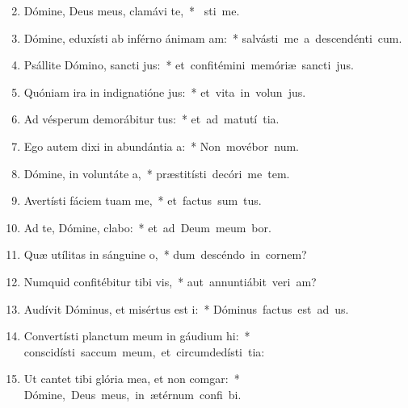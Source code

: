 \begin{flushleft}
\begin{enumerate}[leftmargin=*]
\setcounter{enumi}{1}

\item Dómine, Deus meus, clamávi  te,~* \mbox{ sti me.}
\item Dómine, eduxísti ab inférno ánimam am:~* \mbox{salvásti me a descendénti  cum.}
\item Psállite Dómino, sancti jus:~* \mbox{et confitémini memóriæ sancti jus.}
\item Quóniam ira in indignatióne jus:~* \mbox{et vita in volun jus.}
\item Ad vésperum demorábitur tus:~* \mbox{et ad matutí tia.}
\item Ego autem dixi in abundántia a:~* \mbox{Non movébor  num.}
\item Dómine, in voluntáte a,~* \mbox{præstitísti decóri me tem.}
\item Avertísti fáciem tuam  me,~* \mbox{et factus sum tus.}
\item Ad te, Dómine, clabo:~* \mbox{et ad Deum meum bor.}
\item Quæ utílitas in sánguine o,~* \mbox{dum descéndo in cornem?}
\item Numquid confitébitur tibi vis,~* \mbox{aut annuntiábit veri am?}
\item Audívit Dóminus, et misértus est i:~* \mbox{Dóminus factus est ad us.}
\item Convertísti planctum meum in gáudium hi:~* \mbox{conscidísti saccum meum, et circumdedísti  tia:}
\item Ut cantet tibi glória mea, et non comgar:~* \mbox{Dómine, Deus meus, in ætérnum confi bi.}

\end{enumerate}
\end{flushleft}

